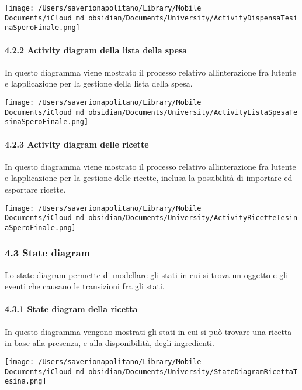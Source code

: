 \documentclass[
]{article}
\begin{document}
\texttt{[image: /Users/saverionapolitano/Library/Mobile Documents/iCloud~md~obsidian/Documents/University/ActivityDispensaTesinaSperoFinale.png]}

\paragraph{4.2.2 Activity diagram della lista della
spesa}\label{activity-diagram-della-lista-della-spesa}

In questo diagramma viene mostrato il processo relativo
all\textquotesingle interazione fra l\textquotesingle utente e
l\textquotesingle applicazione per la gestione della lista della spesa.

\texttt{[image: /Users/saverionapolitano/Library/Mobile Documents/iCloud~md~obsidian/Documents/University/ActivityListaSpesaTesinaSperoFinale.png]}

\paragraph{4.2.3 Activity diagram delle
ricette}\label{activity-diagram-delle-ricette}

In questo diagramma viene mostrato il processo relativo
all\textquotesingle interazione fra l\textquotesingle utente e
l\textquotesingle applicazione per la gestione delle ricette, inclusa la
possibilità di importare ed esportare ricette.

\texttt{[image: /Users/saverionapolitano/Library/Mobile Documents/iCloud~md~obsidian/Documents/University/ActivityRicetteTesinaSperoFinale.png]}

\subsubsection{4.3 State diagram}\label{state-diagram}

Lo state diagram permette di modellare gli stati in cui si trova un
oggetto e gli eventi che causano le transizioni fra gli stati.

\paragraph{4.3.1 State diagram della
ricetta}\label{state-diagram-della-ricetta}

In questo diagramma vengono mostrati gli stati in cui si può trovare una
ricetta in base alla presenza, e alla disponibilità, degli ingredienti.

\texttt{[image: /Users/saverionapolitano/Library/Mobile Documents/iCloud~md~obsidian/Documents/University/StateDiagramRicettaTesina.png]}
\end{document}
